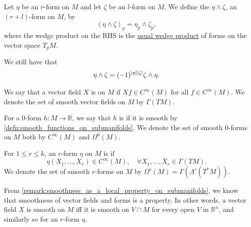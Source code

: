 \documentclass[notoc,notitlepage]{tufte-book}
\begin{document}
\begin{defn}\label{defn:wedge_product_on_submanifolds}
  Let $\eta$ be an $r$-form on $M$ and let $\zeta$ be an $l$-form on $M$. We
  define the  $\eta \land \zeta$, an $(r + l)$-form on
  $M$, by
  \begin{equation*}
    (\eta \land \zeta)_p = \eta_p \land \zeta_p,
  \end{equation*}
  where the wedge product on the RHS is the
  \hyperref[defn:wedge_product_of_k_forms]{usual wedge product} of forms on the
  vector space $T_p M$.
\end{defn}

\begin{note}
  We still have that
  \begin{equation*}
    \eta \land \zeta = (-1)^{\left|\eta\right|\left|\zeta\right|} \zeta \land \eta.
  \end{equation*}
\end{note}

\begin{defn}\label{defn:smooth_vector_fields_on_submanifolds}
  We say that a vector field $X$ is  on $M$ if $Xf \in
  C^\infty(M)$ for all $f \in C^\infty(M)$. We denote the set of smooth vector
  fields on $M$ by $\Gamma(TM)$.
\end{defn}

\begin{defn}\label{defn:smooth_0_forms_on_submanifolds}
  For a $0$-form $h : M \to \mathbb{R}$, we say that $h$ is  if it is
  smooth by \cref{defn:smooth_functions_on_submanifolds}. We denote the set of
  smooth $0$-forms on $M$ both by $C^\infty(M)$ and $\Omega^0(M)$.
\end{defn}

\begin{defn}\label{defn:smooth_r_forms_on_a_submanifold}
  For $1 \leq r \leq k$, an $r$-form $\eta$ on $M$ is  if
  \begin{equation*}
    \eta(X_1, \ldots, X_r) \in C^\infty(M), \quad \forall X_1, \ldots, X_r \in
    \Gamma(TM).
  \end{equation*}
  We denote the set of smooth $r$-forms on $M$ by $\Omega^r(M) =
  \Gamma(\Lambda^r(T^* M))$.
\end{defn}

\begin{remark}
  From \cref{remark:smoothness_as_a_local_property_on_submanifolds}, we know
  that smoothness of vector fields and forms is a  property. In
  other words, a vector field $X$ is smooth on $M$ iff it is smooth on $V \cap
  M$ for every open $V$ in $\mathbb{R}^n$, and similarly so for an $r$-form
  $\eta$.
\end{remark}
\end{document}
